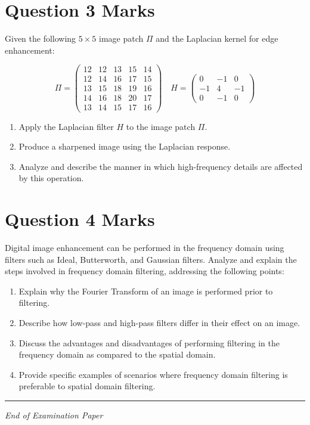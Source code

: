 \documentclass[12pt,a4paper]{article}
\begin{document}
\section*{Question 3 \quad [CLO1-PL01-C4]  Marks}

Given the following $5 \times 5$ image patch $\Pi$ and the Laplacian kernel for edge enhancement:

\begin{equation*}
\Pi = \begin{pmatrix}
12 & 12 & 13 & 15 & 14 \\
12 & 14 & 16 & 17 & 15 \\
13 & 15 & 18 & 19 & 16 \\
14 & 16 & 18 & 20 & 17 \\
13 & 14 & 15 & 17 & 16
\end{pmatrix}
\quad
H = \begin{pmatrix}
0 & -1 & 0 \\
-1 & 4 & -1 \\
0 & -1 & 0
\end{pmatrix}
\end{equation*}

\begin{enumerate}
\item[(a)] Apply the Laplacian filter $H$ to the image patch $\Pi$.
\item[(b)] Produce a sharpened image using the Laplacian response.
\item[(c)] Analyze and describe the manner in which high-frequency details are affected by this operation.
\end{enumerate}

\vspace{1.0cm}
\section*{Question 4 \quad [CLO1-PL01-C4]  Marks}

Digital image enhancement can be performed in the frequency domain using filters such as Ideal, Butterworth, and Gaussian filters. Analyze and explain the steps involved in frequency domain filtering, addressing the following points:

\begin{enumerate}
\item[(a)] Explain why the Fourier Transform of an image is performed prior to filtering.
\item[(b)] Describe how low-pass and high-pass filters differ in their effect on an image.
\item[(c)] Discuss the advantages and disadvantages of performing filtering in the frequency domain as compared to the spatial domain.
\item[(d)] Provide specific examples of scenarios where frequency domain filtering is preferable to spatial domain filtering.
\end{enumerate}

\vspace{2.0cm}
\noindent\rule{\textwidth}{0.5pt}
\begin{center}
\textit{End of Examination Paper}
\end{center}
\end{document}
